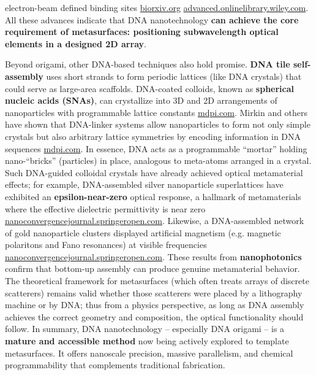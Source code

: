 \documentclass[11pt,a4paper]{article}
\begin{document}
electron-beam defined binding sites \href{https://www.biorxiv.org/content/10.1101/2025.01.23.634416v1.full-text#:~:text=,Adv}{biorxiv.org} \href{https://advanced.onlinelibrary.wiley.com/toc/16163028/34/42#:~:text=Advanced Functional Materials%3A Vol 34%2C,electron beam lithography are}{advanced.onlinelibrary.wiley.com}. All these advances indicate that DNA nanotechnology \textbf{can achieve the core requirement of metasurfaces: positioning subwavelength optical elements in a designed 2D array}.

Beyond origami, other DNA-based techniques also hold promise. \textbf{DNA tile self-assembly} uses short strands to form periodic lattices (like DNA crystals) that could serve as large-area scaffolds. DNA-coated colloids, known as \textbf{spherical nucleic acids (SNAs)}, can crystallize into 3D and 2D arrangements of nanoparticles with programmable lattice constants \href{https://www.mdpi.com/2079-6374/12/11/962#:~:text=The initial research with DNA,suspended in solution with dispersed}{mdpi.com}. Mirkin and others have shown that DNA-linker systems allow nanoparticles to form not only simple crystals but also arbitrary lattice symmetries by encoding information in DNA sequences \href{https://www.mdpi.com/2079-6374/12/11/962#:~:text=match at L1720 the name,to program its crystal structure}{mdpi.com}. In essence, DNA acts as a programmable ``mortar'' holding nano-``bricks'' (particles) in place, analogous to meta-atoms arranged in a crystal. Such DNA-guided colloidal crystals have already achieved optical metamaterial effects; for example, DNA-assembled silver nanoparticle superlattices have exhibited an \textbf{epsilon-near-zero} optical response, a hallmark of metamaterials where the effective dielectric permittivity is near zero \href{https://nanoconvergencejournal.springeropen.com/articles/10.1186/s40580-020-00226-7#:~:text=match at L923 DNA,143]. Here%2C DNA is}{nanoconvergencejournal.springeropen.com}. Likewise, a DNA-assembled network of gold nanoparticle clusters displayed artificial magnetism (e.g. magnetic polaritons and Fano resonances) at visible frequencies \href{https://nanoconvergencejournal.springeropen.com/articles/10.1186/s40580-020-00226-7#:~:text=match at L934 have been,origami has been employed to}{nanoconvergencejournal.springeropen.com}. These results from \textbf{nanophotonics} confirm that bottom-up assembly can produce genuine metamaterial behavior. The theoretical framework for metasurfaces (which often treats arrays of discrete scatterers) remains valid whether those scatterers were placed by a lithography machine or by DNA; thus from a physics perspective, as long as DNA assembly achieves the correct geometry and composition, the optical functionality should follow. In summary, DNA nanotechnology -- especially DNA origami -- is a \textbf{mature and accessible method} now being actively explored to template metasurfaces. It offers nanoscale precision, massive parallelism, and chemical programmability that complements traditional fabrication.
\end{document}

